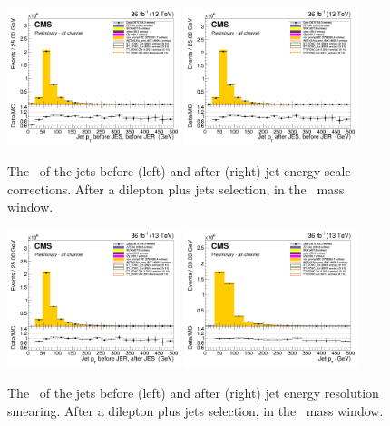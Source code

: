 \begin{figure}[htbp]
	\centering
	\includegraphics[width=0.45\textwidth]{5_Eventselection/Figures/Reweighing/JEC/2lepcontrol_afterAtLeast1Jet_afterZWindow_JetPt_bfJES_all_Stack}
	\includegraphics[width=0.45\textwidth]{5_Eventselection/Figures/Reweighing/JEC/2lepcontrol_afterAtLeast1Jet_afterZWindow_JetPt_afJES_all_Stack}
	\caption{The \pt\ of the jets before (left) and after (right) jet energy scale corrections. After a dilepton plus jets selection, in the \PZ\ mass window.}
	\label{fig:jesSF}
\end{figure}

\begin{figure}[htbp]
	\centering
	\includegraphics[width=0.45\textwidth]{5_Eventselection/Figures/Reweighing/JER/2lepcontrol_afterAtLeast1Jet_afterZWindow_JetPt_bfJER_all_Stack}
	\includegraphics[width=0.45\textwidth]{5_Eventselection/Figures/Reweighing/JER/2lepcontrol_afterAtLeast1Jet_afterZWindow_JetPt_afJER_all_Stack}
	\caption{The \pt\ of the jets before (left) and after (right) jet energy resolution smearing. After a dilepton plus jets selection, in the \PZ\ mass window.}
	\label{fig:jerSF}
\end{figure}


